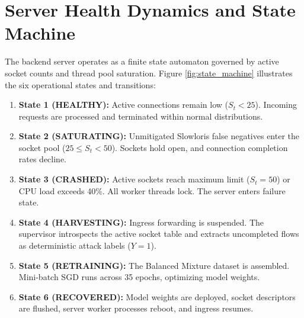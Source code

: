 \documentclass[12pt,a4paper,oneside]{report}
\begin{document}
\section{Server Health Dynamics and State Machine}
The backend server operates as a finite state automaton governed by active socket counts and thread pool saturation. Figure \ref{fig:state_machine} illustrates the six operational states and transitions:
\begin{enumerate}
    \item \textbf{State 1 (HEALTHY):} Active connections remain low ($S_t < 25$). Incoming requests are processed and terminated within normal distributions.
    \item \textbf{State 2 (SATURATING):} Unmitigated Slowloris false negatives enter the socket pool ($25 \le S_t < 50$). Sockets hold open, and connection completion rates decline.
    \item \textbf{State 3 (CRASHED):} Active sockets reach maximum limit ($S_t = 50$) or CPU load exceeds 40\%. All worker threads lock. The server enters failure state.
    \item \textbf{State 4 (HARVESTING):} Ingress forwarding is suspended. The supervisor introspects the active socket table and extracts uncompleted flows as deterministic attack labels ($Y=1$).
    \item \textbf{State 5 (RETRAINING):} The Balanced Mixture dataset is assembled. Mini-batch SGD runs across 35 epochs, optimizing model weights.
    \item \textbf{State 6 (RECOVERED):} Model weights are deployed, socket descriptors are flushed, server worker processes reboot, and ingress resumes.
\end{enumerate}
\end{document}
